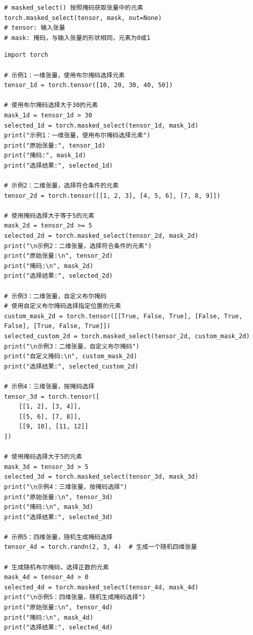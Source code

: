 \begin{lstlisting}[style=demostyle,numbers=none]
# masked_select() 按照掩码获取张量中的元素
torch.masked_select(tensor, mask, out=None)
# tensor: 输入张量
# mask: 掩码，与输入张量的形状相同，元素为0或1
\end{lstlisting}
\begin{lstlisting}[style=pythonstyle]
import torch

# 示例1：一维张量，使用布尔掩码选择元素
tensor_1d = torch.tensor([10, 20, 30, 40, 50])

# 使用布尔掩码选择大于30的元素
mask_1d = tensor_1d > 30
selected_1d = torch.masked_select(tensor_1d, mask_1d)
print("示例1：一维张量，使用布尔掩码选择元素")
print("原始张量:", tensor_1d)
print("掩码:", mask_1d)
print("选择结果:", selected_1d)

# 示例2：二维张量，选择符合条件的元素
tensor_2d = torch.tensor([[1, 2, 3], [4, 5, 6], [7, 8, 9]])

# 使用掩码选择大于等于5的元素
mask_2d = tensor_2d >= 5
selected_2d = torch.masked_select(tensor_2d, mask_2d)
print("\n示例2：二维张量，选择符合条件的元素")
print("原始张量:\n", tensor_2d)
print("掩码:\n", mask_2d)
print("选择结果:", selected_2d)

# 示例3：二维张量，自定义布尔掩码
# 使用自定义布尔掩码选择指定位置的元素
custom_mask_2d = torch.tensor([[True, False, True], [False, True, False], [True, False, True]])
selected_custom_2d = torch.masked_select(tensor_2d, custom_mask_2d)
print("\n示例3：二维张量，自定义布尔掩码")
print("自定义掩码:\n", custom_mask_2d)
print("选择结果:", selected_custom_2d)

# 示例4：三维张量，按掩码选择
tensor_3d = torch.tensor([
    [[1, 2], [3, 4]],
    [[5, 6], [7, 8]],
    [[9, 10], [11, 12]]
])

# 使用掩码选择大于5的元素
mask_3d = tensor_3d > 5
selected_3d = torch.masked_select(tensor_3d, mask_3d)
print("\n示例4：三维张量，按掩码选择")
print("原始张量:\n", tensor_3d)
print("掩码:\n", mask_3d)
print("选择结果:", selected_3d)

# 示例5：四维张量，随机生成掩码选择
tensor_4d = torch.randn(2, 3, 4)  # 生成一个随机四维张量

# 生成随机布尔掩码，选择正数的元素
mask_4d = tensor_4d > 0
selected_4d = torch.masked_select(tensor_4d, mask_4d)
print("\n示例5：四维张量，随机生成掩码选择")
print("原始张量:\n", tensor_4d)
print("掩码:\n", mask_4d)
print("选择结果:", selected_4d)
\end{lstlisting}
